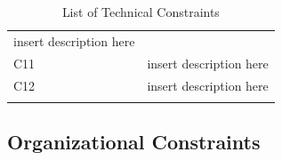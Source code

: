 \documentclass[]{article}
\begin{document}
\begin{longtable}[c]{@{}ll@{}}
\begin{minipage}[t]{0.75\columnwidth}
insert description here
\end{minipage}
\\\addlinespace
\begin{minipage}[t]{0.19\columnwidth}\raggedright
C11
\end{minipage} & \begin{minipage}[t]{0.75\columnwidth}\raggedright
insert description here
\end{minipage}
\\\addlinespace
\begin{minipage}[t]{0.19\columnwidth}\raggedright
C12
\end{minipage} & \begin{minipage}[t]{0.75\columnwidth}\raggedright
insert description here
\end{minipage}
\\\addlinespace
\bottomrule
\addlinespace
\caption{List of Technical Constraints}
\end{longtable}

\subsection{Organizational Constraints}
\end{document}
